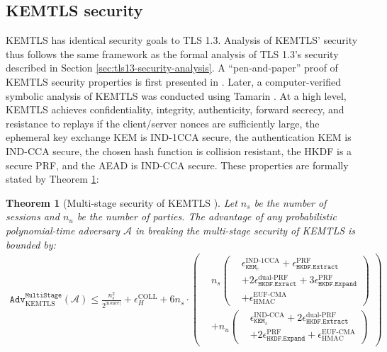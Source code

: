 \documentclass[letterpaper,12pt,titlepage,oneside,final]{book}
\newtheorem{theorem}{Theorem}[section]
\newcommand{\kem}{\texttt{KEM}}
\newcommand{\adv}{\texttt{Adv}}
\begin{document}
\subsection{KEMTLS security}\label{sec:kemtls-security}
KEMTLS has identical security goals to TLS 1.3.
Analysis of KEMTLS' security thus follows the same framework as the formal analysis of TLS 1.3's security described in Section \ref{sec:tls13-security-analysis}.
A ``pen-and-paper'' proof of KEMTLS security properties is first presented in \cite{DBLP:conf/ccs/SchwabeSW20}.
Later, a computer-verified symbolic analysis of KEMTLS was conducted using Tamarin \cite{DBLP:conf/esorics/CeliHSW22,DBLP:conf/cav/MeierSCB13}.
At a high level, KEMTLS achieves confidentiality, integrity, authenticity, forward secrecy, and resistance to replays if the client/server nonces are sufficiently large, the ephemeral key exchange KEM is IND-1CCA secure, the authentication KEM is IND-CCA secure, the chosen hash function is collision resistant, the HKDF is a secure PRF, and the AEAD is IND-CCA secure.
These properties are formally stated by Theorem \ref{thm:multi-stage-sec-kemtls}:

\begin{theorem}[Multi-stage security of KEMTLS \cite{DBLP:conf/ccs/SchwabeSW20}]\label{thm:multi-stage-sec-kemtls}
    Let $n_s$ be the number of sessions and $n_u$ be the number of parties. The advantage of any probabilistic polynomial-time adversary $\mathcal{A}$ in breaking the multi-stage security of KEMTLS is bounded by:
    \begin{equation*}\begin{aligned}
        \adv^{\texttt{MultiStage}}_{\text{KEMTLS}}(\mathcal{A}) \leq 
        \frac{n_s^2}{2^{\vert \text{nonce} \vert}}
        + \epsilon^\text{COLL}_H
        + 6n_s\cdot \left(\begin{aligned}
            & n_s \left(\begin{aligned}
                & \epsilon^\text{IND-1CCA}_{\kem_e} + \epsilon^\text{PRF}_\texttt{HKDF.Extract} \\
                & + 2\epsilon^\text{dual-PRF}_\texttt{HKDF.Exract} + 3\epsilon^\text{PRF}_\texttt{HKDF.Expand} \\
                & + \epsilon^\text{EUF-CMA}_\text{HMAC}
            \end{aligned}\right)\\
            & + n_u \left(\begin{aligned}
                & \epsilon^\text{IND-CCA}_{\kem_s} + 2\epsilon^\text{dual-PRF}_\texttt{HKDF.Extract} \\
                & + 2\epsilon^\text{PRF}_\texttt{HKDF.Expand} + \epsilon^\text{EUF-CMA}_\text{HMAC}
            \end{aligned}\right)
        \end{aligned}\right)
    \end{aligned}\end{equation*}
\end{theorem}
\end{document}
